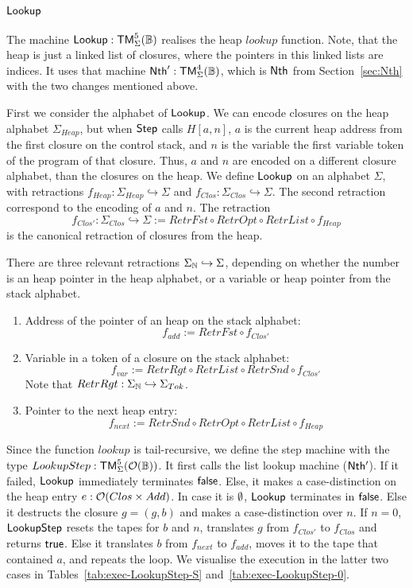 \subsection{$\mathsf{Lookup}$}
\label{sec:Lookup}

The machine $\mathsf{Lookup} : \mathsf{TM}_\Sigma^5(\mathbb{B})$ realises the heap $lookup$ function.  Note, that the heap is just a linked list of closures, where the
pointers in this linked lists are indices.  It uses that machine $\mathsf{Nth}' : \mathsf{TM}_\Sigma^4(\mathbb{B})$, which is $\mathsf{Nth}$ from Section~\ref{sec:Nth}
with the two changes mentioned above.

First we consider the alphabet of $\mathsf{Lookup}$.  We can encode closures on the heap alphabet $\Sigma_{Heap}$, but when $\mathsf{Step}$ calls $H[a,n]$,
$a$ is the current heap address from the first closure on the control stack, and $n$ is the variable the first variable token of the program of that
closure.  Thus, $a$ and $n$ are encoded on a different closure alphabet, than the closures on the heap.  We define $\mathsf{Lookup}$ on an alphabet
$\Sigma$, with retractions $f_{Heap} : \Sigma_{Heap} \hookrightarrow \Sigma$ and $f_{Clos} : \Sigma_{Clos} \hookrightarrow \Sigma$.  The second
retraction correspond to the encoding of $a$ and $n$.  The retraction
\[ f_{Clos'} : \Sigma_{Clos} \hookrightarrow \Sigma := RetrFst \circ RetrOpt \circ RetrList \circ f_{Heap} \]%
is the canonical retraction of closures from the heap.

There are three relevant retractions $\Sigma_{\mathbb{N}} \hookrightarrow \Sigma$, depending on whether the number is an heap pointer in the heap alphabet,
or a variable or heap pointer from the stack alphabet.
\begin{enumerate}
\item Address of the pointer of an heap on the stack alphabet:
  \[
    f_{add} := RetrFst \circ f_{Clos'}
  \]
\item Variable in a token of a closure on the stack alphabet:
  \[
    f_{var} := RetrRgt \circ RetrList \circ RetrSnd \circ f_{Clos'}
  \]
  Note that $RetrRgt : \Sigma_{\mathbb{N}} \hookrightarrow \Sigma_{Tok}$.
\item Pointer to the next heap entry:
  \[
    f_{next} := RetrSnd \circ RetrOpt \circ RetrList \circ f_{Heap}
  \]
\end{enumerate}

Since the function $lookup$ is tail-recursive, we define the step machine with the type $LookupStep : \mathsf{TM}_\Sigma^5(\mathcal{O}(\mathbb{B}))$.  It first calls
the list lookup machine ($\mathsf{Nth'}$).  If it failed, $\mathsf{Lookup}$ immediately terminates $\mathsf{false}$.  Else, it makes a case-distinction on the heap
entry $e : \mathcal{O}(Clos \times Add)$.  In case it is $\emptyset$, $\mathsf{Lookup}$ terminates in $\mathsf{false}$.  Else it destructs the closure $g = (g,b)$ and
makes a case-distinction over $n$.  If $n=0$, $\mathsf{LookupStep}$ resets the tapes for $b$ and $n$, translates $g$ from $f_{Clos'}$ to $f_{Clos}$ and
returns $\mathsf{true}$.  Else it translates $b$ from $f_{next}$ to $f_{add}$, moves it to the tape that contained $a$, and repeats the loop.  We visualise
the execution in the latter two cases in Tables~\ref{tab:exec-LookupStep-S} and~\ref{tab:exec-LookupStep-0}.

